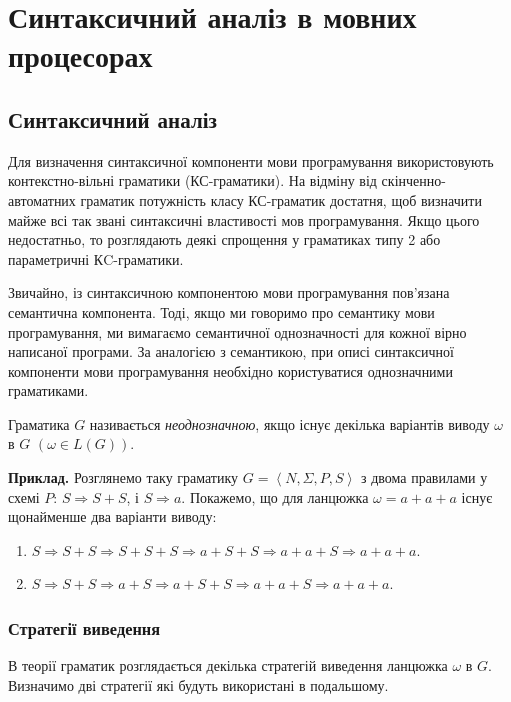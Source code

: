 \setcounter{section}{6}

\section{Синтаксичний аналіз в мовних процесорах}

\subsection{Синтаксичний аналіз}

Для визначення синтаксичної компоненти мови програмування використовують кон\-текст\-но-вільні граматики (КС-граматики). На відміну від скінченно-автоматних граматик потужність класу КС-граматик достатня, щоб визначити майже всі так звані синтаксичні властивості мов програмування. Якщо цього недостатньо, то розглядають деякі спрощення у граматиках типу 2
або параметричні КC-граматики. \medskip

Звичайно, із синтаксичною компонентою мови програмування пов'\-я\-за\-на семантична компонента. Тоді, якщо ми говоримо про семантику мови програмування, ми вимагаємо семантичної однозначності для кожної вірно написаної програми. За аналогією з семантикою, при описі синтаксичної компоненти мови програмування необхідно користуватися однозначними граматиками. \medskip

Граматика $G$ називається \textit{неоднозначною}, якщо існує декілька варіантів виводу $\omega$ в $G$ $\left(\omega \in L(G)\right)$. \medskip

\textbf{Приклад.} Розглянемо таку граматику $G = \left\langle N, \Sigma, P, S\right\rangle$ з двома правилами у схемі $P$: $S \Rightarrow S + S$, і $S \Rightarrow a$. Покажемо, що для ланцюжка $\omega = a + a + a$ існує щонайменше два варіанти виводу:
\begin{enumerate}
	\item $S \Rightarrow S + S \Rightarrow S + S + S \Rightarrow a + S + S \Rightarrow a + a + S \Rightarrow a + a + a$.
	\item $S \Rightarrow S + S \Rightarrow a + S \Rightarrow a + S + S \Rightarrow a + a + S \Rightarrow a + a + a$.
\end{enumerate}

\subsubsection{Стратегії виведення}

В теорії граматик розглядається декілька стратегій виведення ланцюжка $\omega$ в $G$. Визначимо дві стратегії які будуть використані в подальшому. \medskip\

